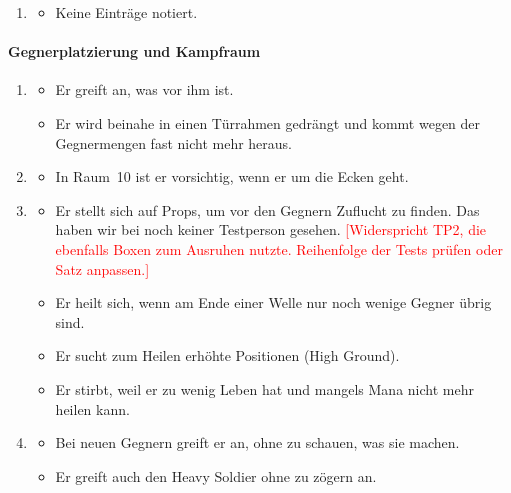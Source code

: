 \documentclass[../Main.tex]{subfiles}
\begin{document}
\begin{enumerate}[label=\textbf{B\arabic*}, leftmargin=1.5cm, itemsep=0.8em]
\begin{itemize}[nosep]
\item Wenn er Schaden nimmt, zieht er sich zurück, wo andere Testpersonen einfach weiter draufgehalten hätten. Das bestraft ihn mehr: Haben alle Gegner einmal angegriffen, kann man sie leicht besiegen; er zieht sich aber zurück und kann deshalb keinen Schaden machen (Eindruck der Beobachtenden).
\item Er ist daher eher empfindlich gegenüber Schaden (Eindruck der Beobachtenden).
\end{itemize}
\item
\begin{itemize}[nosep]
\item Keine Einträge notiert.
\end{itemize}
\end{enumerate}

\paragraph{Gegnerplatzierung und Kampfraum}
\begin{enumerate}[label=\textbf{B\arabic*}, leftmargin=1.5cm, itemsep=0.8em, resume]
\item
\begin{itemize}[nosep]
\item Er greift an, was vor ihm ist.
\item Er wird beinahe in einen Türrahmen gedrängt und kommt wegen der Gegnermengen fast nicht mehr heraus.
\end{itemize}
\item
\begin{itemize}[nosep]
\item In Raum~10 ist er vorsichtig, wenn er um die Ecken geht.
\end{itemize}
\item
\begin{itemize}[nosep]
\item Er stellt sich auf Props, um vor den Gegnern Zuflucht zu finden. Das haben wir bei noch keiner Testperson gesehen. \textcolor{red}{[Widerspricht TP2, die ebenfalls Boxen zum Ausruhen nutzte. Reihenfolge der Tests prüfen oder Satz anpassen.]}
\item Er heilt sich, wenn am Ende einer Welle nur noch wenige Gegner übrig sind.
\item Er sucht zum Heilen erhöhte Positionen (High Ground).
\item Er stirbt, weil er zu wenig Leben hat und mangels Mana nicht mehr heilen kann.
\end{itemize}
\item
\begin{itemize}[nosep]
\item Bei neuen Gegnern greift er an, ohne zu schauen, was sie machen.
\item Er greift auch den Heavy Soldier ohne zu zögern an.
\end{itemize}
\end{enumerate}
\end{document}
